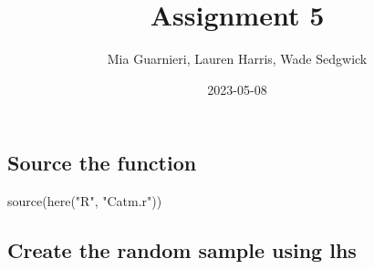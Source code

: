 \documentclass[
]{article}
\title{Assignment 5}
\author{Mia Guarnieri, Lauren Harris, Wade Sedgwick}
\date{2023-05-08}
\newenvironment{Shaded}{\begin{snugshade}}{\end{snugshade}}
\newcommand{\FunctionTok}[1]{\textcolor[rgb]{0.00,0.00,0.00}{#1}}
\newcommand{\NormalTok}[1]{#1}
\newcommand{\StringTok}[1]{\textcolor[rgb]{0.31,0.60,0.02}{#1}}
\begin{document}
\maketitle

\hypertarget{source-the-function}{%
\subsection{Source the function}\label{source-the-function}}

\begin{Shaded}
\begin{Highlighting}[]
\FunctionTok{source}\NormalTok{(}\FunctionTok{here}\NormalTok{(}\StringTok{"R"}\NormalTok{, }\StringTok{"Catm.r"}\NormalTok{))}
\end{Highlighting}
\end{Shaded}

\hypertarget{create-the-random-sample-using-lhs}{%
\subsection{Create the random sample using
lhs}\label{create-the-random-sample-using-lhs}}
\end{document}
